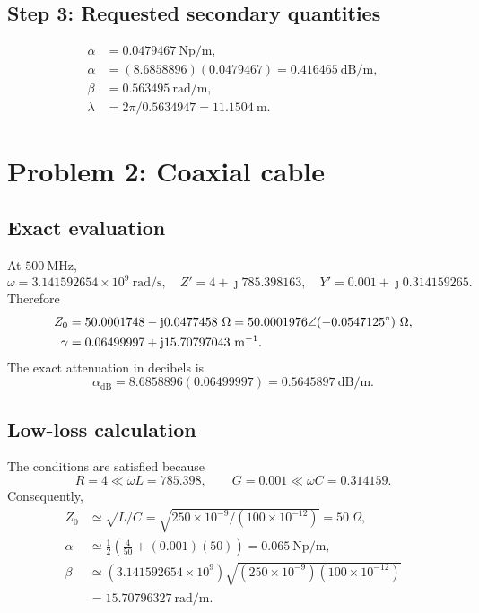 \documentclass[12pt,a4paper]{article}
\begin{document}
\subsection{Step 3: Requested secondary quantities}

\begin{align*}
\alpha&=0.0479467~\mathrm{Np/m},\\
\alpha&=(8.6858896)(0.0479467)=0.416465~\mathrm{dB/m},\\
\beta&=0.563495~\mathrm{rad/m},\\
\lambda&=2\pi/0.5634947=11.1504~\mathrm{m}.
\end{align*}


\section{Problem 2: Coaxial cable}

\subsection{Exact evaluation}

At $500~\mathrm{MHz}$,
\[
\omega=3.141592654\times10^9~\mathrm{rad/s},
\quad
Z'=4+\jmath785.398163,
\quad
Y'=0.001+\jmath0.314159265.
\]
Therefore
\begin{align}
Z_0&=50.0001748-\mathrm{j}0.0477458~\Omega
=50.0001976\angle(-0.0547125^{\circ})~\Omega,\\
\gamma&=0.06499997+\mathrm{j}15.70797043~\mathrm{m}^{-1}.
\end{align}
The exact attenuation in decibels is
\[
\alpha_{\mathrm{dB}}=8.6858896(0.06499997)
=0.5645897~\mathrm{dB/m}.
\]

\subsection{Low-loss calculation}

The conditions are satisfied because
\[
R=4\ll\omega L=785.398,
\qquad
G=0.001\ll\omega C=0.314159.
\]
Consequently,
\begin{align*}
Z_0&\simeq\sqrt{L/C}
=\sqrt{250\times10^{-9}/(100\times10^{-12})}=50~\Omega,\\
\alpha&\simeq\frac{1}{2}\left(\frac{4}{50}
+(0.001)(50)\right)=0.065~\mathrm{Np/m},\\
\beta&\simeq(3.141592654\times10^9)
\sqrt{(250\times10^{-9})(100\times10^{-12})}\\
&=15.70796327~\mathrm{rad/m}.
\end{align*}
\end{document}
